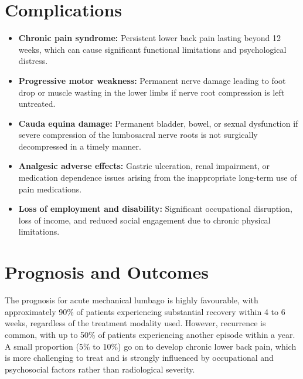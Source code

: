 \section*{Complications}
\begin{itemize}
    \item \textbf{Chronic pain syndrome:} Persistent lower back pain lasting beyond 12 weeks, which can cause significant functional limitations and psychological distress.
    \item \textbf{Progressive motor weakness:} Permanent nerve damage leading to foot drop or muscle wasting in the lower limbs if nerve root compression is left untreated.
    \item \textbf{Cauda equina damage:} Permanent bladder, bowel, or sexual dysfunction if severe compression of the lumbosacral nerve roots is not surgically decompressed in a timely manner.
    \item \textbf{Analgesic adverse effects:} Gastric ulceration, renal impairment, or medication dependence issues arising from the inappropriate long-term use of pain medications.
    \item \textbf{Loss of employment and disability:} Significant occupational disruption, loss of income, and reduced social engagement due to chronic physical limitations.
\end{itemize}

\section*{Prognosis and Outcomes}
The prognosis for acute mechanical lumbago is highly favourable, with approximately 90\% of patients experiencing substantial recovery within 4 to 6 weeks, regardless of the treatment modality used. However, recurrence is common, with up to 50\% of patients experiencing another episode within a year. A small proportion (5\% to 10\%) go on to develop chronic lower back pain, which is more challenging to treat and is strongly influenced by occupational and psychosocial factors rather than radiological severity.

